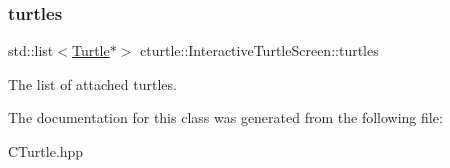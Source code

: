 \subsubsection{\texorpdfstring{turtles}{turtles}}
{\footnotesize\ttfamily std\+::list$<$\hyperlink{classcturtle_1_1Turtle}{Turtle}$\ast$$>$ cturtle\+::\+Interactive\+Turtle\+Screen\+::turtles\hspace{0.3cm}{\ttfamily [protected]}}

The list of attached turtles. 

The documentation for this class was generated from the following file\+:\begin{DoxyCompactItemize}
\item 
C\+Turtle.\+hpp\end{DoxyCompactItemize}
